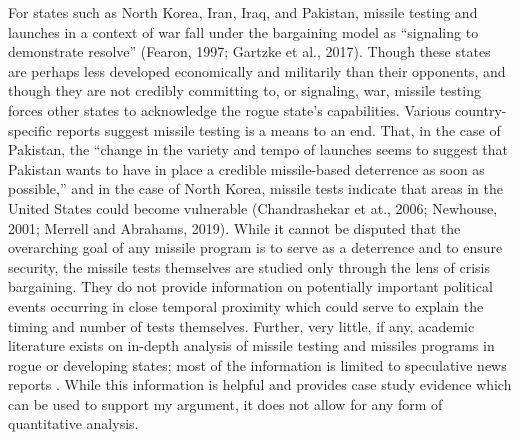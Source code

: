 \documentclass[12pt]{article}
\begin{document}
For states such as North Korea, Iran, Iraq, and Pakistan, missile testing and launches in a context of war fall under the bargaining model as “signaling to demonstrate resolve” (Fearon, 1997; Gartzke et al., 2017). Though these states are perhaps less developed economically and militarily than their opponents, and though they are not credibly committing to, or signaling, war, missile testing forces other states to acknowledge the rogue state’s capabilities. Various country-specific reports suggest missile testing is a means to an end. That, in the case of Pakistan, the “change in the variety and tempo of launches seems to suggest that Pakistan wants to have in place a credible missile-based deterrence as soon as possible,” and in the case of North Korea, missile tests indicate that areas in the United States could become vulnerable (Chandrashekar et at., 2006; Newhouse, 2001; Merrell and Abrahams, 2019). While it cannot be disputed that the overarching goal of any missile program is to serve as a deterrence and to ensure security, the missile tests themselves are studied only through the lens of crisis bargaining. They do not provide information on potentially important political events occurring in close temporal proximity which could serve to explain the timing and number of tests themselves. Further, very little, if any, academic literature exists on in-depth analysis of missile testing and missiles programs in rogue or developing states; most of the information is limited to speculative news reports . While this information is helpful and provides case study evidence which can be used to support my argument, it does not allow for any form of quantitative analysis. 
\end{document}
